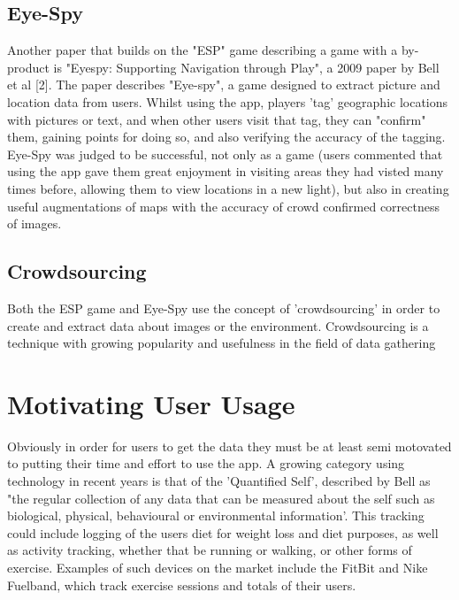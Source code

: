 \documentclass{l4proj}
\begin{document}
\subsection{Eye-Spy}

Another paper that builds on the "ESP" game describing a game with a by-product is "Eyespy: Supporting Navigation through Play", a 2009 paper by Bell et al [2]. The paper describes "Eye-spy", a game designed to extract picture and location data from users. Whilst using the app, players 'tag' geographic locations with pictures or text, and when other users visit that tag, they can "confirm" them, gaining points for doing so, and also verifying the accuracy of the tagging. Eye-Spy was judged to be successful, not only as a game (users commented that using the app gave them great enjoyment in visiting areas they had visted many times before, allowing them to view locations in a new light), but also in creating useful augmentations of maps with the accuracy of crowd confirmed correctness of images.

\subsection{Crowdsourcing}

Both the ESP game and Eye-Spy use the concept of 'crowdsourcing' in order to create and extract data about images or the environment.  Crowdsourcing is a technique with growing popularity and usefulness in the field of data gathering 

\section{Motivating User Usage}

Obviously in order for users to get the data they must be at least semi motovated to putting their time and effort to use the app. A growing category using technology in recent years is that of the 'Quantified Self', described by Bell as "the regular collection of any data that can be measured about the self such as biological, physical, behavioural or environmental information'. This tracking could include logging of the users diet for weight loss and diet purposes, as well as activity tracking, whether that be running or walking, or other forms of exercise. Examples of such devices on the market include the FitBit and Nike Fuelband, which track exercise sessions and totals of their users.
\end{document}
